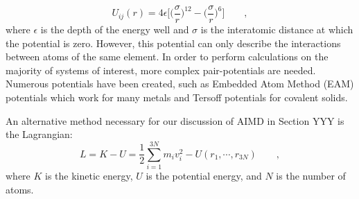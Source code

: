 \documentclass[3p,review,12pt]{elsarticle}
\begin{document}
\begin{equation}
U_{ij}(r) = 4\epsilon \Bigg[\bigg(\frac{\sigma}{r}\bigg)^{12}-\bigg(\frac{\sigma}{r}\bigg)^{6}\Bigg] \qquad ,
\end{equation}
where $\epsilon$ is the depth of the energy well and $\sigma$ is the interatomic distance at which the potential is zero. However, this potential can only describe the interactions between atoms of the same element. In order to perform calculations on the majority of systems of interest, more complex pair-potentials are needed. Numerous potentials have been created, such as Embedded Atom Method (EAM) potentials which work for many metals and Tersoff potentials for covalent solids. 
\par 
An alternative method necessary for our discussion of AIMD in Section YYY is the Lagrangian:
\begin{equation}
L = K-U = \frac{1}{2}\sum_{i=1}^{3N}m_{i}v^{2}_{i}-U(r_{1}, \cdots, r_{3N})\qquad ,
\end{equation}
where $K$ is the kinetic energy, $U$ is the potential energy, and $N$ is the number of atoms.
\end{document}
